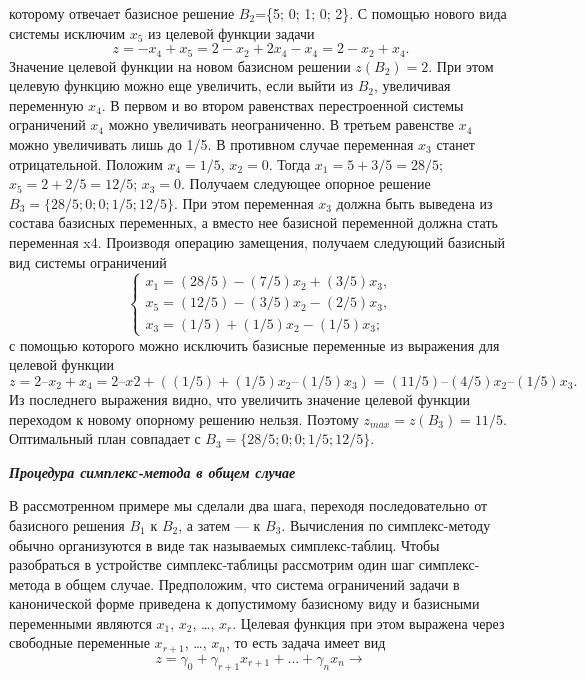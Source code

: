 \documentclass{article}
\begin{document}
которому отвечает базисное решение $B_2$=\{5; 0; 1; 0; 2\}. С помощью нового вида системы исключим $x_5$ из целевой функции задачи 
$$z = -x_4 + x_5 = 2 - x_2 + 2x_4 - x_4 = 2 - x_2 + x_4.$$
Значение целевой функции на новом базисном решении $z(B_2) = 2$. При этом целевую функцию можно еще увеличить, если выйти из $B_2$, увеличивая переменную $x_4$. В первом и во втором равенствах перестроенной системы ограничений $x_4$ можно увеличивать неограниченно. В третьем равенстве $x_4$ можно увеличивать лишь до 1/5. В противном случае переменная $x_3$ станет отрицательной. Положим $x_4 = 1/5$, $x_2 = 0$. Тогда $x_1 = 5 + 3/5 = 28/5$; $x_5 = 2 + 2 / 5 = 12 / 5$; $x_3 = 0$. Получаем следующее опорное решение $B_3=\{28/5; 0; 0; 1/5; 12/5\}$. При этом переменная $x_3$ должна быть выведена из состава базисных переменных, а вместо нее базисной переменной должна стать переменная x4. Производя операцию замещения, получаем следующий базисный вид системы ограничений
\begin{equation*}
\begin{cases}
x_1 = (28/5) - (7/5)x_2 + (3/5)x_3,\\
x_5 = (12/5) - (3/5)x_2 - (2/5)x_3,\\
x_3 = (1/5) + (1/5)x_2 - (1/5)x_3;
\end{cases}
\end{equation*}
с помощью которого можно исключить базисные переменные из выражения для целевой функции
$$z = 2 – x_2 + x_4 = 2 – x2 + ((1/5) + (1/5)x_2 – (1/5)x_3) = (11/5) – (4/5)x_2 – (1/5)x_3.$$
Из последнего выражения видно, что увеличить значение целевой функции переходом к новому опорному решению нельзя. Поэтому $z_{max}= z(B_3) = 11/5$. Оптимальный план совпадает с $B_3 = \{28/5; 0; 0; 1/5; 12/5\}$.
\begin{center}
\textit{\textbf{Процедура симплекс-метода в общем случае}}
\end{center}

В рассмотренном примере мы сделали два шага, переходя последовательно от базисного решения $B_1$ к $B_2$, а затем — к $B_3$. Вычисления по симплекс-методу обычно организуются в виде так называемых симплекс-таблиц. Чтобы разобраться в устройстве симплекс-таблицы рассмотрим один шаг симплекс-метода в общем случае. Предположим, что система ограничений задачи в канонической форме приведена к допустимому базисному виду и базисными переменными являются $x_1$, $x_2$, \dots, $x_r$. Целевая функция при этом выражена через свободные переменные $x_{r+1}$, \dots, $x_n$, то есть задача имеет вид
$$z = \gamma_0 + \gamma_{r+1}x_{r+1} +\dots+\gamma_nx_n \rightarrow$$
\end{document}
